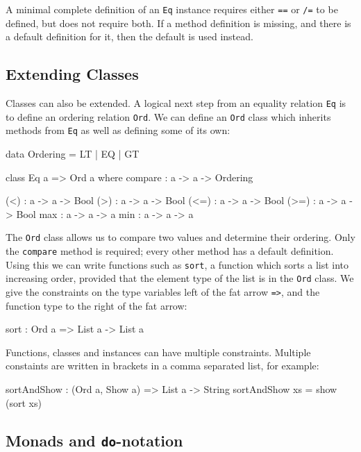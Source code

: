\noindent
A minimal complete definition of an \texttt{Eq} instance requires either \texttt{==}
or \texttt{/=} to be defined, but does not require both. If a method definition is
missing, and there is a default definition for it, then the default is used instead.

\subsection{Extending Classes}

Classes can also be extended. A logical next step from an equality relation \texttt{Eq}
is to define an ordering relation \texttt{Ord}. We can define an \texttt{Ord} class
which inherits methods from \texttt{Eq} as well as defining some of its own:

\begin{code}
data Ordering = LT | EQ | GT
\end{code} 

\begin{code}
class Eq a => Ord a where
    compare : a -> a -> Ordering

    (<) : a -> a -> Bool
    (>) : a -> a -> Bool
    (<=) : a -> a -> Bool
    (>=) : a -> a -> Bool
    max : a -> a -> a
    min : a -> a -> a
\end{code}

\noindent
The \texttt{Ord} class allows us to compare two values and determine their ordering. 
Only the \texttt{compare} method is required; every other method has a default definition.
Using
this we can write functions such as \texttt{sort}, a function which sorts a list into
increasing order, provided that the element type of the list is in the \texttt{Ord} class.
We give the constraints on the type variables left of the fat arrow \texttt{=>}, and the
function type to the right of the fat arrow:

\begin{code}
sort : Ord a => List a -> List a
\end{code}

\noindent
Functions, classes and instances can have multiple constraints. Multiple constaints are
written in brackets in a comma separated list, for example:

\begin{code}
sortAndShow : (Ord a, Show a) => List a -> String
sortAndShow xs = show (sort xs)
\end{code}

\subsection{Monads and \texttt{do}-notation}


